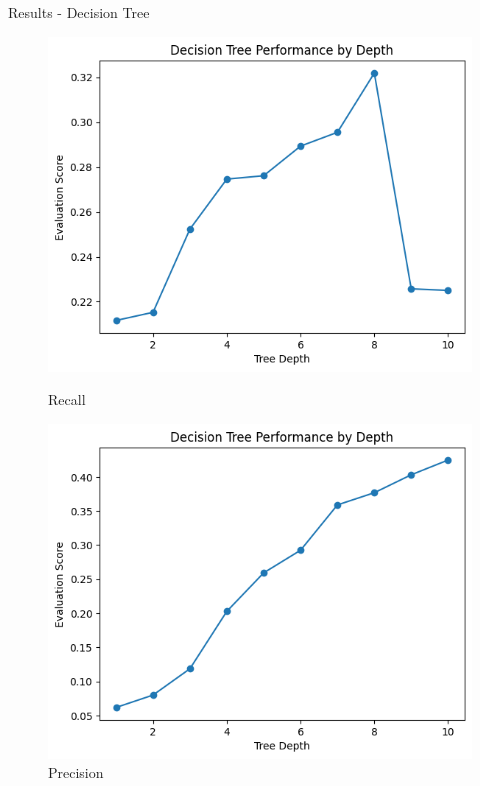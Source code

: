 \documentclass{beamer}
\begin{document}
\begin{frame}[t]{Results - Decision Tree}
\begin{figure}[h]
\begin{minipage}{0.3\textwidth}
		\includegraphics[width=\linewidth]{images/DecisionTree/recall.png}
		\caption{Recall}
	\end{minipage}
	\hfill
	\begin{minipage}{0.3\textwidth}
		\centering
		\includegraphics[width=\linewidth]{images/DecisionTree/precision.png}
		\caption{Precision}
	\end{minipage}
\end{figure}
\end{frame}
\end{document}
